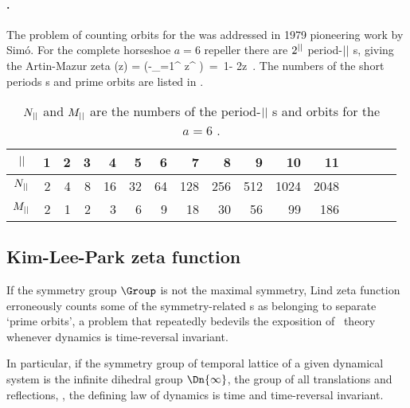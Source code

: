 \paragraph{\Henlatt.}
The problem of counting orbits for the {\HenonMap} was addressed in 1979
pioneering work by Sim{\'o}.
For the complete horseshoe ${a}=6$ {\HenonMap} repeller
there are $2^{||}$
period-${||}$ {\lattstate}s, giving
the Artin-Mazur zeta
\bea
\zetatop(z)
 =  \exp \left(-\sum_{\cl{}=1}^\infty
{} z^\cl{}
         \right)
\,=\,
1- 2z
\,.
\label{HenonZeta}
\eea
The numbers of the short periods {\lattstate}s and prime orbits are
listed in .

\begin{table}
\begin{tabular}{c|rrrrr|rrrrr|rrrrr}
${||}$ &  1 &  2 &  3 &  4 &  5 &
       6 &  7 &  8 &  9 & 10 &
      11 & \\%
\hline
$N_{||}$ &  2 &  4 &  8 & 16 &  32 &
       64 &  128 &  256 & 512 & 1024 &
      2048 & %
             \rule[-1ex]{0ex}{3.5ex} \\
$M_{||}$ &   2 &   1 &   2 &  3 &  6 &
         9 & 18 &  30 & 56  & 99 &
       186 &  %
\end{tabular}
\bigskip
\caption{\label{tab:LC21HamHenon}
$N_{||}$ and $M_{||}$ are the numbers of
the period-${||}$ {\lattstate}s and
orbits for the ${a}=6$ {\HenonMap}.
}
\end{table}
%

\subsection{Kim-Lee-Park zeta function}
\label{sect:KiLePa}

If the symmetry group $\Group$ is not the maximal symmetry, Lind zeta
function erroneously counts some of the symmetry-related {\lattstate}s as
belonging to separate `prime orbits', a problem that repeatedly bedevils
the \wwwcb{} exposition of \po\ theory whenever dynamics is time-reversal
invariant.

In particular, if the symmetry group of temporal lattice of a
given dynamical system is the {infinite dihedral group} $\Dn{\infty}$,
the group of all translations and reflections, \ie, the
defining law of dynamics is time and time-reversal invariant.

